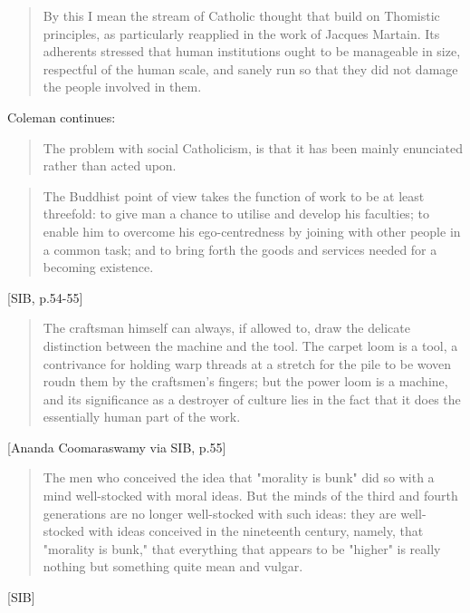 \begin{quote}
By this I mean the stream of Catholic thought that build on Thomistic principles, as particularly reapplied in the work of Jacques Martain. Its adherents stressed that human institutions ought to be manageable in size, respectful of the human scale, and sanely run so that they did not damage the people involved in them.
\end{quote}


Coleman continues:

\begin{quote}
The problem with social Catholicism, is that it has been mainly enunciated rather than acted upon.
\end{quote}






\begin{quote}
The Buddhist point of view takes the function of work to be at least threefold: to give man a chance to utilise and develop his faculties; to enable him to overcome his ego-centredness by joining with other people in a common task; and to bring forth the goods and services needed for a becoming existence.
\end{quote} [SIB, p.54-55]

\begin{quote}
The craftsman himself can always, if allowed to, draw the delicate distinction between the machine and the tool. The carpet loom is a tool, a contrivance for holding warp threads at a stretch for the pile to be woven roudn them by the craftsmen's fingers; but the power loom is a machine, and its significance as a destroyer of culture lies in the fact that it does the essentially human part of the work.
\end{quote} [Ananda Coomaraswamy via SIB, p.55]


\begin{quote}
  The men who conceived the idea that "morality is bunk" did so with a mind well-stocked with moral ideas. But the minds of the third and fourth generations are no longer well-stocked with such ideas: they are well-stocked with ideas conceived in the nineteenth century, namely, that "morality is bunk," that everything that appears to be "higher" is really nothing but something quite mean and vulgar.
\end{quote}[SIB]


